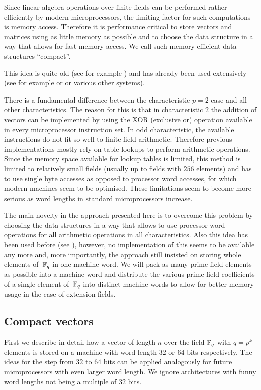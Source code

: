 Since linear algebra operations over finite fields can be performed
rather efficiently by modern microprocessors, the limiting factor 
for such computations is memory access. Therefore it is performance
critical to store vectors and matrices using as little memory as possible
and to choose the data structure in a way that allows for fast memory
access. We call such memory efficient data structures ``compact''.

This idea is quite old (see for example \cite{MeatAxeRP}) and has already 
been used extensively (see for example \cite{CMeatAxe} or \cite{GAP4} or
various other systems).

There is a fundamental difference between the characteristic $p=2$ case
and all other characteristics. The reason for this is that in
characteristic $2$ the addition of vectors can be implemented by using
the XOR (exclusive or) operation available in every microprocessor
instruction set. In odd characteristic, the available instructions
do not fit so well to finite field arithmetic. Therefore previous
implementations mostly rely on table lookups to perform arithmetic
operations. Since the memory space available for lookup tables is
limited, this method is limited to relatively small fields (usually up to
fields with $256$ elements) and has to use single byte accesses
as opposed to processor word accesses, for which modern machines
seem to be optimised. These limitations seem to become more serious
as word lengths in standard microprocessors increase.

The main novelty in the approach presented here is to overcome this
problem by choosing the data structures in a way that allows to use
processor word operations for all arithmetic operations in all
characteristics. Also this idea has been used before (see
\cite{EssenLinAlg}), however, no implementation of this seems to
be available any more and, more importantly, the approach still
insisted on storing whole elements of\, $\mathbb{F}_q$ in one machine word.
We will pack as many prime field elements as possible into a machine
word and distribute the various prime field coefficients of a single
element of\, $\mathbb{F}_q$ into distinct machine words to allow for better
memory usage in the case of extension fields.


\subsection{Compact vectors}
\label{ssec:cvec}

First we describe in detail how a vector of length $n$ over the field
$\mathbb{F}_q$ with $q=p^k$ elements is stored on a machine with word length $32$ 
or $64$ bits respectively. The ideas for the step from $32$ to $64$ bits
can be applied analogously for future microprocessors with even larger
word length. We ignore architectures with funny word lengths not being
a multiple of $32$ bits.

